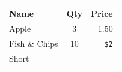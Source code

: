 \begin{center}
\begin{tabular}{lcr}
\hline
\textbf{Name} & \textbf{Qty} & \textbf{Price} \\
\hline
Apple & 3 & 1.50 \\
Fish \& Chips & 10 & \texttt{\$2} \\
Short &  &  \\
\hline
\end{tabular}
\end{center}
